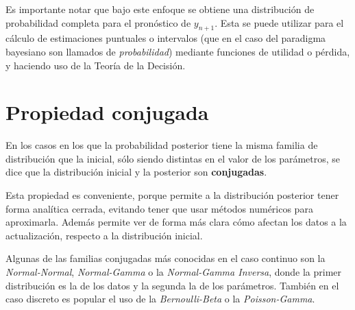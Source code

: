 Es importante notar que bajo este enfoque se obtiene una distribuci\'on de probabilidad completa para  el pron\'ostico de $y_{n+1}$. Esta se puede utilizar para el c\'alculo de estimaciones puntuales o intervalos (que en el caso del paradigma bayesiano son llamados de \textit{probabilidad}) mediante funciones de utilidad o p\'erdida, y haciendo uso de la Teor\'ia de la Decisi\'on.

\section{Propiedad conjugada}

En los casos en los que la probabilidad posterior tiene la misma familia de distribuci\'on que la inicial, s\'olo siendo distintas en el valor de los par\'ametros, se dice que la distribuci\'on inicial y la posterior son \textbf{conjugadas}.

Esta propiedad es conveniente, porque permite a la distribuci\'on posterior tener forma anal\'itica cerrada, evitando tener que usar m\'etodos num\'ericos para aproximarla. Adem\'as permite ver de forma m\'as clara c\'omo afectan los datos a la actualizaci\'on, respecto a la distribuci\'on inicial.

Algunas de las familias conjugadas m\'as conocidas en el caso continuo son la \textit{Normal-Normal}, \textit{Normal-Gamma} o la \textit{Normal-Gamma Inversa}, donde la primer distribuci\'on es la de los datos y la segunda la de los par\'ametros. Tambi\'en en el caso discreto es popular el uso de la \textit{Bernoulli-Beta} o la \textit{Poisson-Gamma}.

\newpage